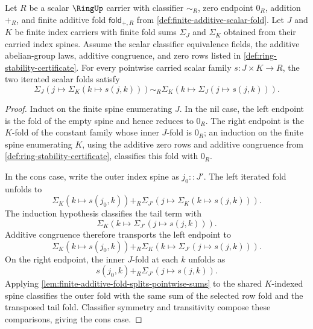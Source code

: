 \begin{lemma}
Let $R$ be a scalar $\RingUp$ carrier with classifier $\sim_R$, zero endpoint $0_R$, addition $+_R$, and finite additive fold $\mathsf{fold}_{+,R}$ from \autoref{def:finite-additive-scalar-fold}. Let $J$ and $K$ be finite index carriers with finite fold sums $\Sigma_J$ and $\Sigma_K$ obtained from their carried index spines. Assume the scalar classifier equivalence fields, the additive abelian-group laws, additive congruence, and zero rows listed in \autoref{def:ring-stability-certificate}. For every pointwise carried scalar family $s:J\times K\to R$, the two iterated scalar folds satisfy
$$
\Sigma_J(j\mapsto\Sigma_K(k\mapsto s(j,k)))\sim_R
\Sigma_K(k\mapsto\Sigma_J(j\mapsto s(j,k))).
$$
\end{lemma}
\begin{proof}
Induct on the finite spine enumerating $J$. In the nil case, the left endpoint is the fold of the empty spine and hence reduces to $0_R$. The right endpoint is the $K$-fold of the constant family whose inner $J$-fold is $0_R$; an induction on the finite spine enumerating $K$, using the additive zero rows and additive congruence from \autoref{def:ring-stability-certificate}, classifies this fold with $0_R$.

In the cons case, write the outer index spine as $j_0::J'$. The left iterated fold unfolds to
$$
\Sigma_K(k\mapsto s(j_0,k))+_R
\Sigma_{J'}(j\mapsto\Sigma_K(k\mapsto s(j,k))).
$$
The induction hypothesis classifies the tail term with
$$
\Sigma_K(k\mapsto\Sigma_{J'}(j\mapsto s(j,k))).
$$
Additive congruence therefore transports the left endpoint to
$$
\Sigma_K(k\mapsto s(j_0,k))+_R
\Sigma_K(k\mapsto\Sigma_{J'}(j\mapsto s(j,k))).
$$
On the right endpoint, the inner $J$-fold at each $k$ unfolds as
$$
s(j_0,k)+_R\Sigma_{J'}(j\mapsto s(j,k)).
$$
Applying \autoref{lem:finite-additive-fold-splits-pointwise-sums} to the shared $K$-indexed spine classifies the outer fold with the same sum of the selected row fold and the transposed tail fold. Classifier symmetry and transitivity compose these comparisons, giving the cons case.
\end{proof}
